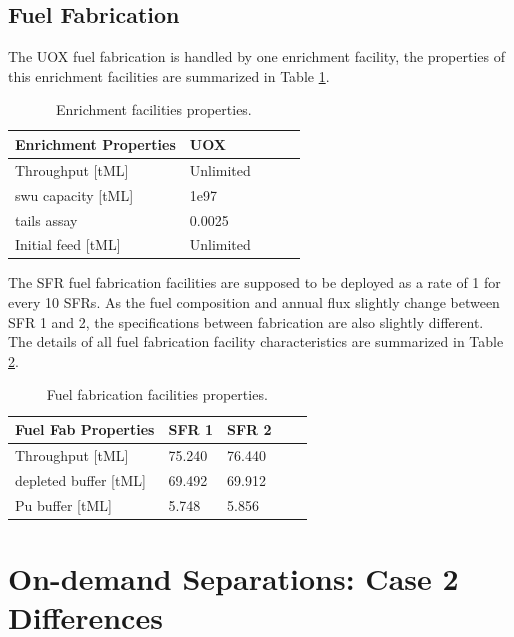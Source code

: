 \documentclass[12pt]{article}
\begin{document}
\subsection{Fuel Fabrication}

The UOX fuel fabrication is handled by one enrichment facility, the properties
of this enrichment facilities are summarized in Table \ref{tab:enrich_1}.

\begin{table}[h!]
    \centering
    \begin{tabular}{lllll}
    \hline
    Enrichment Properties	&	UOX		\\
    \hline
    Throughput [tML]		&	Unlimited	\\
    swu capacity [tML]		&	1e97		\\
    tails assay  			&	0.0025	\\
    Initial feed [tML]		&	Unlimited	\\
    \hline
    \end{tabular}
    \caption{Enrichment facilities properties. }
    \label{tab:enrich_1}
\end{table}

The SFR fuel fabrication facilities are supposed to be deployed as a rate of 1
for every 10 SFRs.  As the fuel composition and annual flux slightly change
between SFR 1 and 2, the specifications between fabrication are also slightly
different. The details of all fuel fabrication facility characteristics are
summarized in Table \ref{tab:fuelfab_1}.

\begin{table}[h!]
    \centering
    \begin{tabular}{lllll}
    \hline
    Fuel Fab Properties	&	SFR 1	&	SFR 2	\\
    \hline
    Throughput [tML]	&	75.240	&	76.440	\\
    depleted buffer [tML]	&	69.492	&	69.912	\\
    Pu buffer  [tML]		&	5.748	&	5.856	\\
    \hline
    \end{tabular}
    \caption{Fuel fabrication facilities properties.}
    \label{tab:fuelfab_1}
\end{table}

\section{On-demand Separations: Case 2 Differences}
\label{sec:case2}
\end{document}
